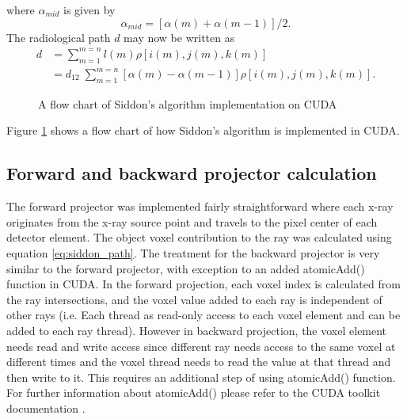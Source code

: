 where $\alpha_{mid}$ is given by 
\begin{equation}
\alpha_{mid} = \left[ \alpha(m) + \alpha(m-1) \right] /2.
\label{eq:siddon_alphamid}
\end{equation}
The radiological path $d$ may now be written as 
\begin{equation}
\begin{aligned}
d &= \sum\limits_{m = 1}^{m = n} l(m) \rho\left[ i(m), j(m), k(m) \right] \\
  &= d_{12} \; \sum\limits_{m = 1}^{m = n} \left[ \alpha(m) - \alpha(m-1) \right] \rho \left[ i(m), j(m), k(m) \right].
\end{aligned}
\label{eq:siddon_path}
\end{equation}

\begin{figure}
\centering
{}
\caption{A flow chart of Siddon's algorithm implementation on CUDA}
\label{fig:siddon_algorithm_flow_chart}
\end{figure}

Figure \ref{fig:siddon_algorithm_flow_chart} shows a flow chart of how Siddon's algorithm is implemented in CUDA.

\subsection{Forward and backward projector calculation}

The forward projector was implemented fairly straightforward where each x-ray originates from the x-ray source point and travels to the pixel center of each detector element.  The object voxel contribution to the ray was calculated using equation \ref{eq:siddon_path}.  The treatment for the backward projector is very similar to the forward projector, with exception to an added atomicAdd() function in CUDA.  In the forward projection, each voxel index is calculated from the ray intersections, and the voxel value added to each ray is independent of other rays (i.e. Each thread as read-only access to each voxel element and can be added to each ray thread).  However in backward projection, the voxel element needs read and write access since different ray needs access to the same voxel at different times and the voxel thread needs to read the value at that thread and then write to it.  This requires an additional step of using atomicAdd() function.  For further information about atomicAdd() please refer to the CUDA toolkit documentation \cite{Cudatoolkit}.  

